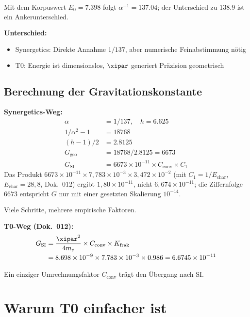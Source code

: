 	Mit dem Korpuswert $E_0 = 7.398$ folgt $\alpha^{-1} = 137.04$; der Unterschied zu $138.9$ ist ein Ankerunterschied.
	
	\textbf{Unterschied:}
	\begin{itemize}
		\item Synergetics: Direkte Annahme $1/137$, aber numerische Feinabstimmung nötig
		\item T0: Energie ist dimensionslos, $\xipar$ generiert Präzision geometrisch
	\end{itemize}
	
	\subsection{Berechnung der Gravitationskonstante}
	
	\textbf{Synergetics-Weg:}
	\begin{align}
		\alpha &= 1/137, \quad h = 6.625 \\
		1/\alpha^2 - 1 &= 18768 \\
		(h-1)/2 &= 2.8125 \\
		G_{\text{geo}} &= 18768 / 2.8125 = 6673 \\
		G_{\text{SI}} &= 6673 \times 10^{-11} \times C_{\text{conv}} \times C_1
	\end{align}
	Das Produkt $6673\times10^{-11}\times7{,}783\times10^{-3}\times3{,}472\times10^{-2}$ (mit $C_1 = 1/E_{\text{char}}$, $E_{\text{char}} = 28{,}8$, Dok.~012) ergibt $1{,}80\times10^{-11}$, nicht $6{,}674\times10^{-11}$; die Ziffernfolge $6673$ entspricht $G$ nur mit einer gesetzten Skalierung $10^{-14}$.
	
	Viele Schritte, mehrere empirische Faktoren.
	
	\textbf{T0-Weg (Dok.~012):}
	\begin{align}
		G_{\text{SI}} &= \frac{\xipar^2}{4m_e} \times C_{\text{conv}} \times K_{\text{frak}} \\
		&= 8.698 \times 10^{-9} \times 7.783 \times 10^{-3} \times 0.986 = 6.6745 \times 10^{-11}
	\end{align}
	
	Ein einziger Umrechnungsfaktor $C_{\text{conv}}$ trägt den Übergang nach SI.
	
	\section{Warum T0 einfacher ist}
	
